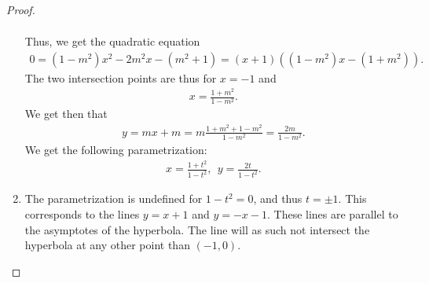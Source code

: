 \begin{proof}
\begin{enumerate}
\begin{align*}
        \end{align*}
        Thus, we get the quadratic equation
        \begin{align*}
            0 
            = (1 - m^2) x^2 - 2m^2 x - (m^2 + 1) 
            = (x+1)( (1 - m^2)x-(1+m^2) ).
        \end{align*}
        The two intersection points are thus for $x=-1$ and
        \begin{align*}
            x = \frac{1 + m^2}{1 - m^2}.
        \end{align*}
        We get then that
        \begin{align*}
            y 
            = mx+m 
            = m\frac{1+m^2 + 1-m^2}{1-m^2} 
            = \frac{2m}{1-m^2}.
        \end{align*}
        We get the following parametrization:
        \begin{align*}
            x = \frac{1 + t^2}{1-t^2},~~y = \frac{2t}{1-t^2}.
        \end{align*}
        \item The parametrization is undefined for $1-t^2 = 0$, and thus $t=\pm 1$. 
        This corresponds to the lines $y=x+1$ and $y=-x-1$. 
        These lines are parallel to the asymptotes of the hyperbola. 
        The line will as such not intersect the hyperbola at any other point than $(-1,0)$.
    \end{enumerate}
\end{proof}

